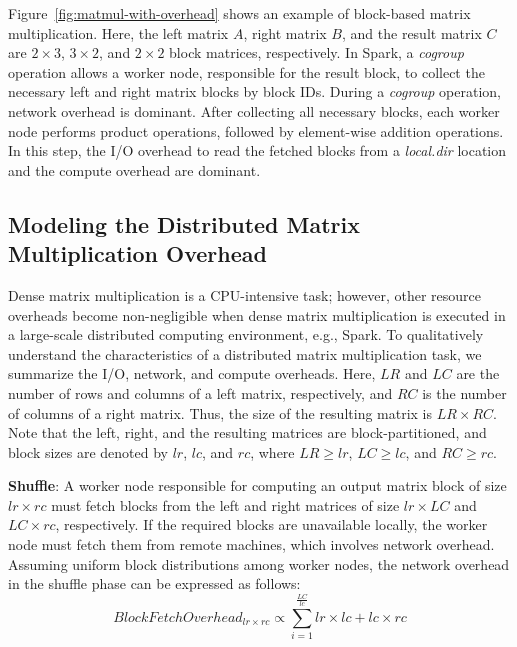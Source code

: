 \documentclass[10pt, conference, compsocconf]{IEEEtran}
\begin{document}
Figure~\ref{fig:matmul-with-overhead} shows an example of block-based matrix multiplication. Here, the left matrix $A$, right matrix $B$, and the result matrix $C$ are  $2 \times 3$,  $3 \times 2$, and $2 \times 2$ block matrices, respectively. In Spark, a \textit{cogroup} operation allows a worker node, responsible for the result block, to collect the necessary left and right matrix blocks by block IDs. During a \textit{cogroup} operation, network overhead is dominant. After collecting all necessary blocks, each worker node performs product operations, followed by element-wise addition operations. In this step, the I/O overhead to read the fetched blocks from a \textit{local.dir} location and the compute overhead are dominant.

\subsection{Modeling the  Distributed Matrix Multiplication Overhead }\label{sec:overhead-modeling}
Dense matrix multiplication is a CPU-intensive task; however, other resource overheads become non-negligible when dense matrix multiplication is executed in a large-scale distributed computing environment, e.g., Spark. To qualitatively understand the characteristics of a distributed matrix multiplication task, we summarize the I/O, network, and compute overheads. Here, $LR$ and $LC$ are the number of rows and columns of a left matrix, respectively, and  $RC$ is the number of columns of a right matrix. Thus, the size of the resulting matrix is $LR \times RC$. Note that the left, right, and the resulting matrices are block-partitioned, and block sizes are denoted by $lr$, $lc$, and $rc$, where $LR \geq lr$, $LC \geq lc$, and $RC \geq rc$.

\textbf{Shuffle}: A worker node responsible for computing an output matrix block of size $lr \times rc$ must fetch blocks from the left and right matrices of size  $lr \times LC$ and $LC \times rc$, respectively. If the required blocks are unavailable locally, the worker node must fetch them from remote machines, which involves network overhead. Assuming uniform block distributions among worker nodes, the network overhead in the shuffle phase can be expressed as follows:
\begin{equation}\label{eq:shuffle-overhead}
  BlockFetchOverhead_{lr \times rc} \propto \sum\limits_{i=1}^{\frac{LC}{lc}} lr \times lc + lc \times rc
\end{equation}
\end{document}
